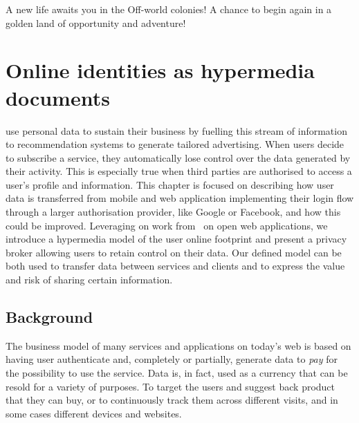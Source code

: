 \begin{savequote}[75mm]
A new life awaits you in the Off-world colonies! A chance to begin again in a golden land of opportunity and adventure!
\end{savequote}

\chapter{Online identities as hypermedia documents}

 use personal data to sustain their business by fuelling this stream of information to recommendation systems to generate tailored advertising. When users decide to subscribe a service, they automatically lose control over the data generated by their activity. This is especially true when third parties are authorised to access a user's profile and information. 
This chapter is focused on describing how user data is transferred from mobile and web application implementing their login flow through a larger authorisation provider, like Google or Facebook, and how this could be improved. Leveraging on work from~\cite{puglisi2015restful} on open web applications, we introduce a hypermedia model of the user online footprint and present a privacy broker allowing users to retain control on their data. Our defined model can be both used to transfer data between services and clients and to express the value and risk of sharing certain information.

\section{Background}

The business model of many services and applications on today's web is based on having user authenticate and, completely or partially, generate data to \emph{pay} for the possibility to use the service. Data is, in fact, used as a currency that can be resold for a variety of purposes. To target the users and suggest back product that they can buy, or to continuously track them across different visits, and in some cases different devices and websites.

